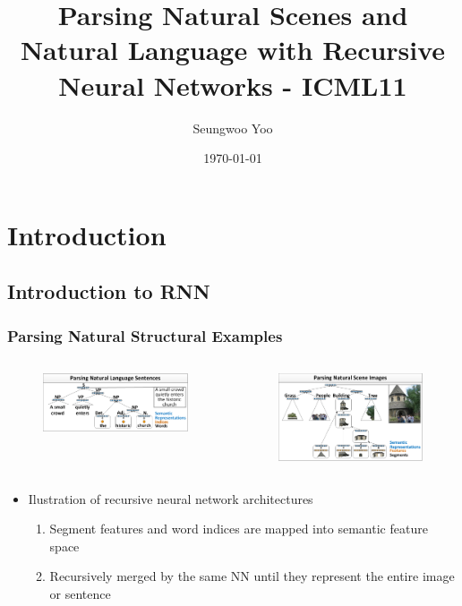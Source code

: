 \documentclass{beamer}
\title{Parsing Natural Scenes and Natural Language with Recursive Neural Networks - ICML11}
\author{Seungwoo Yoo}
\date{\today}
\begin{document}
\frame{\titlepage}

\section[Outline]{}
\frame{\tableofcontents}

\section{Introduction}
\subsection{Introduction to RNN}
\frame
{
  \frametitle{Parsing Natural Structural Examples}
  \begin{columns}
  \begin{figure}[ht]  
	  \begin{center}
		  \includegraphics[width=2.1in]{images/fig1.png}   
	  \end{center}   
  \end{figure}
  \begin{figure}[ht]
	  \begin{center}
		  \includegraphics[width=2.1in]{images/fig2.png} 
	  \end{center}
  \end{figure}
  \end{columns}
  \begin{itemize}
  \item Ilustration of recursive neural network architectures
	\begin{enumerate}
	\item Segment features and word indices are mapped into semantic feature space
	\item Recursively merged by the same NN until they represent the entire image or sentence
	\end{enumerate}
  \end{itemize}
}
\end{document}
